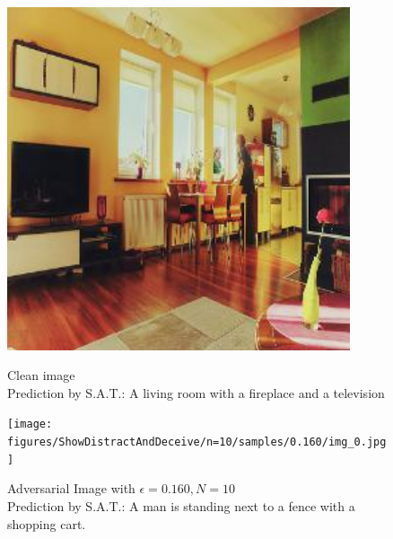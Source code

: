 \begin{figure}[ht]
    \centering
    \begin{minipage}{0.45\textwidth}
        \centering
        \includegraphics[width=0.9\textwidth]{figures/ShowDistractAndDeceive/n=10/samples/0.000/img_0.jpg} %
        \caption*{Clean image\\Prediction by S.A.T.: A living room with a fireplace and a television}
    \end{minipage}\hfill
    \begin{minipage}{0.45\textwidth}
        \centering
        \texttt{[image: figures/ShowDistractAndDeceive/n=10/samples/0.160/img\_0.jpg]} %
        \caption*{Adversarial Image with $\epsilon=0.160, N=10$\\Prediction by S.A.T.: A man is standing next to a fence with a shopping cart.}
    \end{minipage}
\end{figure}

